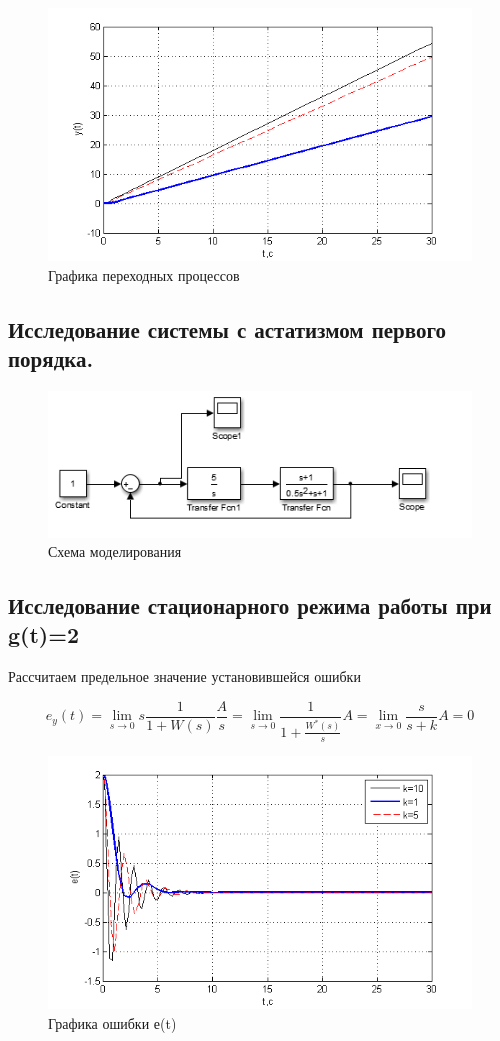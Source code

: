 \documentclass[a4paper, 10pt]{article}
\begin{document}
\begin{figure}[H]
	\centering
	\includegraphics[width=0.7\linewidth]{44}
	\caption{Графика переходных процессов}
	\label{fig:44}
\end{figure}
\clearpage
\begin{center}
\section{Исследование системы с астатизмом первого порядка.}\hfill\par
\end{center}		
	\begin{figure}[h]
	\center\includegraphics[width=0.6\linewidth]{5}
		\caption{Схема моделирования}
		\label{fig:5}
	\end{figure}

\subsection{Исследование стационарного режима работы при g(t)=2}\hfill\par
Рассчитаем предельное значение установившейся ошибки

\begin{equation}
{e_y}(t) = \mathop {\lim }\limits_{s \to 0} s\frac{1}{{1 + W(s)}}\frac{A}{s} = \mathop {\lim }\limits_{s \to 0} \frac{1}{{1 + \frac{{{W^*}(s)}}{s}}}A = \mathop {\lim }\limits_{x \to 0} \frac{s}{{s + k}}A = 0
\end{equation}

	\begin{figure}[h]
		\centering
		\includegraphics[width=0.7\linewidth]{7}
		\caption{Графика ошибки е(t)}
		\label{fig:7}
	\end{figure}
\end{document}
